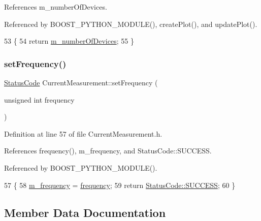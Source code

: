References m\+\_\+number\+Of\+Devices.



Referenced by B\+O\+O\+S\+T\+\_\+\+P\+Y\+T\+H\+O\+N\+\_\+\+M\+O\+D\+U\+L\+E(), create\+Plot(), and update\+Plot().


\begin{DoxyCode}
53                        \{
54     \textcolor{keywordflow}{return} \hyperlink{classCurrentMeasurement_a073f6aba41750712d620e60e346f2315}{m\_numberOfDevices}; 
55   \} 
\end{DoxyCode}
\mbox{\label{classCurrentMeasurement_ae990f376398bc25891eaddcb245fdf46}} 
\subsubsection{\texorpdfstring{set\+Frequency()}{setFrequency()}}
{\footnotesize\ttfamily \hyperlink{classStatusCode}{Status\+Code} Current\+Measurement\+::set\+Frequency (\begin{DoxyParamCaption}\item[{unsigned int}]{frequency }\end{DoxyParamCaption})\hspace{0.3cm}{\ttfamily [inline]}}



Definition at line 57 of file Current\+Measurement.\+h.



References frequency(), m\+\_\+frequency, and Status\+Code\+::\+S\+U\+C\+C\+E\+SS.



Referenced by B\+O\+O\+S\+T\+\_\+\+P\+Y\+T\+H\+O\+N\+\_\+\+M\+O\+D\+U\+L\+E().


\begin{DoxyCode}
57                                                  \{
58     \hyperlink{classCurrentMeasurement_a66e12903825632c0434e3b7cf929a960}{m\_frequency} = \hyperlink{classCurrentMeasurement_ae7c60d0b14808000df5f1d633e0ca990}{frequency};
59     \textcolor{keywordflow}{return} \hyperlink{classStatusCode_a6f565cbeadc76d14c72f047e5e85eb4badd0da38d3ba0d922efd1f4619bc37ad8}{StatusCode::SUCCESS};
60   \}
\end{DoxyCode}


\subsection{Member Data Documentation}
\mbox{\label{classCurrentMeasurement_a793b1467b6a5388361340d41f9e8833f}} 
